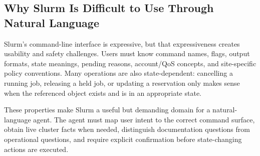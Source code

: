 \subsection{Why Slurm Is Difficult to Use Through Natural Language}

Slurm's command-line interface is expressive, but that expressiveness creates usability and safety challenges. Users must know command names, flags, output formats, state meanings, pending reasons, account/QoS concepts, and site-specific policy conventions. Many operations are also state-dependent: cancelling a running job, releasing a held job, or updating a reservation only makes sense when the referenced object exists and is in an appropriate state.

These properties make Slurm a useful but demanding domain for a natural-language agent. The agent must map user intent to the correct command surface, obtain live cluster facts when needed, distinguish documentation questions from operational questions, and require explicit confirmation before state-changing actions are executed.
